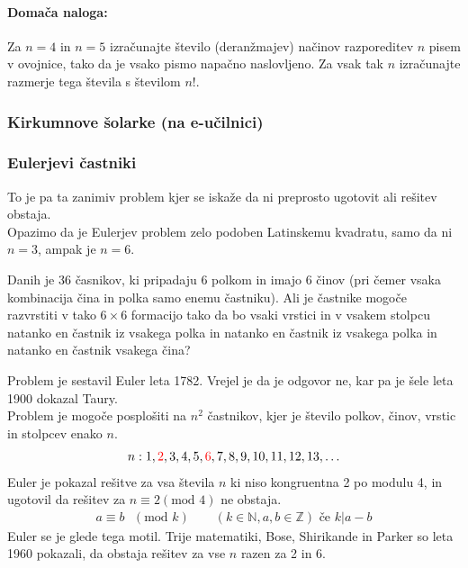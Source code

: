 \paragraph{Domača naloga:} 
Za $n = 4$ in $n = 5$ izračunajte število (deranžmajev) načinov razporeditev $n$ pisem v ovojnice, tako da je vsako pismo napačno naslovljeno. Za vsak tak $n$ izračunajte razmerje tega števila s številom $n!$.

\subsubsection{Kirkumnove šolarke (na e-učilnici)}

\subsubsection{Eulerjevi častniki}
To je pa ta zanimiv problem kjer se iskaže da ni preprosto ugotovit ali rešitev obstaja. \\
Opazimo da je Eulerjev problem zelo podoben Latinskemu kvadratu, samo da ni $n = 3$, ampak je $n = 6$.


\noindent
Danih je 36 časnikov, ki pripadaju 6 polkom in imajo 6 činov (pri čemer vsaka kombinacija čina in polka samo enemu častniku). Ali je častnike mogoče razvrstiti v tako $6 \times 6$ formacijo tako da bo vsaki vrstici in v vsakem stolpcu natanko en častnik iz vsakega polka in natanko en častnik iz vsakega polka in natanko en častnik vsakega čina?



\noindent
Problem je sestavil Euler leta 1782. Vrejel je da je odgovor ne, kar pa je šele leta 1900 dokazal Taury. \\[1em]
Problem je mogoče posplošiti na $n^2$ častnikov, kjer je število polkov, činov, vrstic in stolpcev enako $n$.
\begin{align*}
    n: 1, \textcolor{red}{2}, 3, 4, 5, \textcolor{red}{6}, 7, 8, 9, 10, 11, 12, 13,\dots
\end{align*}
Euler je pokazal rešitve za vsa števila $n$ ki niso kongruentna 2 po modulu 4, in ugotovil da rešitev za $n \equiv 2 (\text{mod } 4)$ ne obstaja.
\begin{align*}
    a \equiv b \text{ } (\text{mod } k) \text{ } \text{ } \text{ } (k \in \mathbb{N}, a,b \in \mathbb{Z}) \text{ če } k | a - b
\end{align*}
Euler se je glede tega motil. Trije matematiki, Bose, Shirikande in Parker so leta 1960 pokazali, da obstaja rešitev za vse $n$ razen za 2 in 6.

